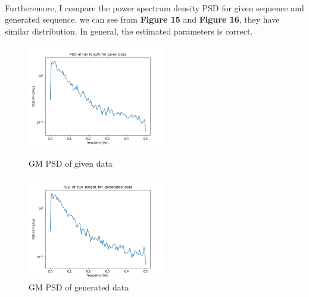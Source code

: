 \documentclass[11pt]{article}
\begin{document}
\paragraph{}
Furtheremore, I compare the power spectrum density PSD for given sequence and generated sequence.
we can see from \textbf{Figure 15} and \textbf{Figure 16}, they have similar distribution.
In general, the estimated parameters is correct.
\begin{figure}[htbp]
    \centering
    \begin{minipage}[t]{0.48\textwidth}
    \centering
    \includegraphics[width=6cm]{GM_PSD_of_run_length_for_given_data.png}
    \caption{GM PSD of given data}
    \end{minipage}
    \begin{minipage}[t]{0.48\textwidth}
    \centering
    \includegraphics[width=6cm]{GM_PSD_of_run_length_for_generated_data.png}
    \caption{GM PSD of generated data}
    \end{minipage}
\end{figure}
\clearpage
{}
\end{document}
